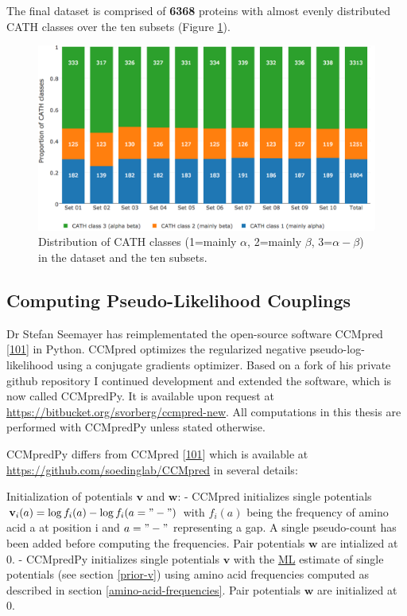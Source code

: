 \documentclass[11pt,a4paper,twoside]{book}
\renewcommand{\v}{\mathbf{v}}
\newcommand{\w}{\mathbf{w}}
\theoremstyle{definition}
\theoremstyle{definition}
\theoremstyle{remark}
\begin{document}
The final dataset is comprised of \textbf{6368} proteins with almost
evenly distributed CATH classes over the ten subsets (Figure
\ref{fig:dataset-cath-topologies}).





\begin{figure}
\includegraphics[width=1\linewidth]{img/dataset_statistics/cath_topologies_stacked_reative_notitle} \caption{Distribution of CATH classes
(1=mainly \(\alpha\), 2=mainly \(\beta\), 3=\(\alpha-\beta\)) in the
dataset and the ten subsets. }\label{fig:dataset-cath-topologies}
\end{figure}

\subsection{Computing Pseudo-Likelihood
Couplings}\label{diff-ccmpred-ccmpredpy}

Dr Stefan Seemayer has reimplementated the open-source software CCMpred
{[}\protect\hyperlink{ref-Seemayer2014}{101}{]} in Python. CCMpred
optimizes the regularized negative pseudo-log-likelihood using a
conjugate gradients optimizer. Based on a fork of his private github
repository I continued development and extended the software, which is
now called CCMpredPy. It is available upon request at
\url{https://bitbucket.org/svorberg/ccmpred-new}. All computations in
this thesis are performed with CCMpredPy unless stated otherwise.

CCMpredPy differs from CCMpred
{[}\protect\hyperlink{ref-Seemayer2014}{101}{]} which is available at
\url{https://github.com/soedinglab/CCMpred} in several details:

Initialization of potentials \(\v\) and \(\w\): - CCMpred initializes
single potentials \(\v_i(a) = \log f_i(a) - \log f_i(a= "-")\) with
\(f_i(a)\) being the frequency of amino acid a at position i and
\(a="-"\) representing a gap. A single pseudo-count has been added
before computing the frequencies. Pair potentials \(\w\) are intialized
at 0. - CCMpredPy initializes single potentials \(\v\) with the
\protect\hyperlink{abbrev}{ML} estimate of single potentials (see
section \ref{prior-v}) using amino acid frequencies computed as
described in section \ref{amino-acid-frequencies}. Pair potentials
\(\w\) are initialized at 0.
\end{document}
